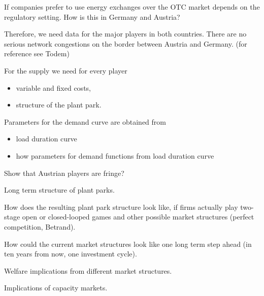 If companies prefer to use energy exchanges over the OTC market depends on the regulatory setting. How is this in Germany and Austria?

Therefore, we need data for the major players in both countries. There are no serious network congestions on the border between Austria and Germany. (for reference see Todem)

For the supply we need for every player

\begin{itemize}
\item variable and fixed costs,
\item structure of the plant park.
\end{itemize}

Parameters for the demand curve are obtained from

\begin{itemize}
\item load duration curve
\item how parameters for demand functions from load duration curve
\end{itemize}

Show that Austrian players are fringe? 

Long term structure of plant parks.

How does the resulting plant park structure look like, if firms actually play two-stage open or closed-looped games and other possible market structures (perfect competition, Betrand). 

How could the current market structures look like one long term step ahead (in ten years from now, one investment cycle).

Welfare implications from different market structures.

Implications of capacity markets.

